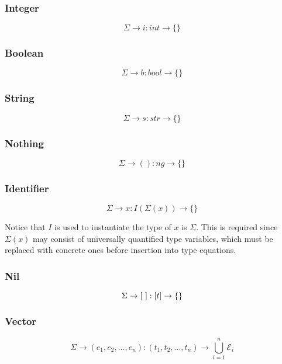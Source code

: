 \documentclass[titlepage]{article}
\begin{document}
\subsubsection{Integer}

$$\Sigma \rightarrow i : int \rightarrow \{\}$$

\subsubsection{Boolean}

$$\Sigma \rightarrow b : bool \rightarrow \{\}$$

\subsubsection{String}

$$\Sigma \rightarrow s : str \rightarrow \{\}$$

\subsubsection{Nothing}

$$\Sigma \rightarrow () : ng \rightarrow \{\}$$

\subsubsection{Identifier}

$$\Sigma \rightarrow x : I(\Sigma(x)) \rightarrow \{\}$$

Notice that $I$ is used to instantiate the type of $x$ is $\Sigma$. This is required since $\Sigma(x)$ may consist of universally quantified type variables, which must be replaced with concrete ones before insertion into type equations.


\subsubsection{Nil}

$$\Sigma \rightarrow [ \text{ } ] : [\space t \space ] \rightarrow \{\}$$



\subsubsection{Vector}

$$\Sigma \rightarrow (e_1, e_2, \dots, e_n) : (t_1, t_2, \dots, t_n) \rightarrow \bigcup_{i = 1} ^ n \mathcal{E}_i$$
\noindent\makebox[\linewidth]{\rule{3.15in}{0.4pt}}
\end{document}
